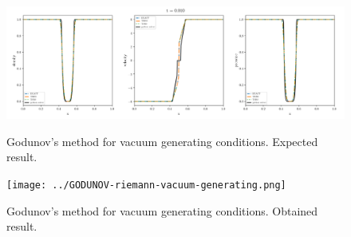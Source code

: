 \begin{figure}[htbp]
    \centering
	\includegraphics[width=.9\textwidth]{./figures/GODUNOV-riemann-vacuum-generating.png}%
	\caption{Godunov's method for vacuum generating conditions. Expected result.}
	\texttt{[image: ../GODUNOV-riemann-vacuum-generating.png]}%
	\caption{Godunov's method for vacuum generating conditions. Obtained result.}
\end{figure}






